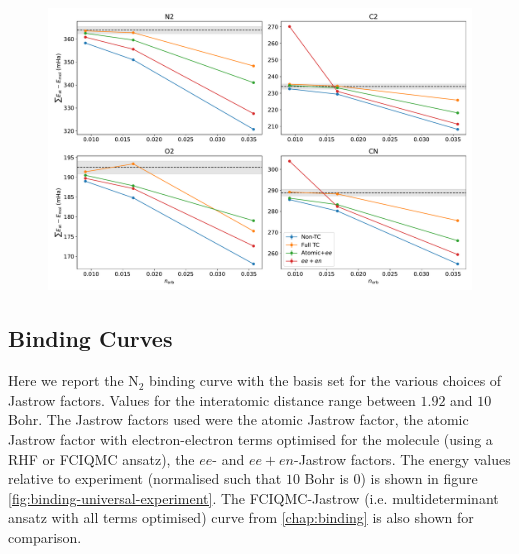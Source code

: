 \begin{figure}[htbp]
    \centering
    \includegraphics[width=\textwidth]{figures/universal/atomisation_energies}
    \caption{
    }
    \label{fig:universal-atomisation}
\end{figure}




\subsection{Binding Curves}

Here we report the N$_2$ binding curve with the \avtz basis set for the various choices of Jastrow factors. Values for the interatomic distance range between $1.92$ and $10$ Bohr. The Jastrow factors used were the atomic Jastrow factor, the atomic Jastrow factor with electron-electron terms optimised for the molecule (using a RHF or FCIQMC ansatz), the $ee$- and $ee+en$-Jastrow factors. The energy values relative to experiment (normalised such that $10$ Bohr is $0$) is shown in figure \ref{fig:binding-universal-experiment}. The FCIQMC-Jastrow (i.e. multideterminant ansatz with all terms optimised) curve from \autoref{chap:binding} is also shown for comparison.


